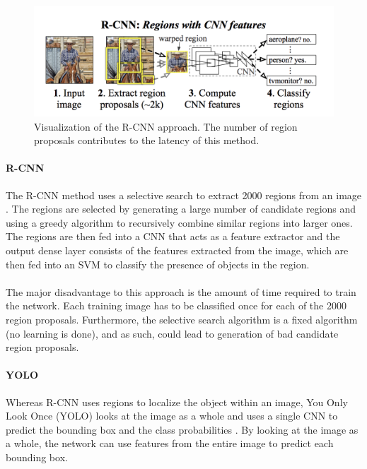 \begin{figure}[ht]
	\centering
	\includegraphics[width=.9\linewidth]{img/chapter2_background/rcnn.png}
	\caption{Visualization of the R-CNN approach. The number of region proposals contributes to the latency of this method.}
\end{figure}

\paragraph{R-CNN} The R-CNN method uses a selective search to extract 2000 regions from an image \cite{Girshick2014}. The regions are selected by generating a large number of candidate regions and using a greedy algorithm to recursively combine similar regions into larger ones. The regions are then fed into a CNN that acts as a feature extractor and the output dense layer consists of the features extracted from the image, which are then fed into an SVM to classify the presence of objects in the region.

\paragraph{}The major disadvantage to this approach is the amount of time required to train the network. Each training image has to be classified once for each of the 2000 region proposals. Furthermore, the selective search algorithm is a fixed algorithm (no learning is done), and as such, could lead to generation of bad candidate region proposals.

\paragraph{YOLO} \label{sec:backYOLO} Whereas R-CNN uses regions to localize the object within an image, You Only Look Once (YOLO) looks at the image as a whole and uses a single CNN to predict the bounding box and the class probabilities \cite{Redmon}. By looking at the image as a whole, the network can use features from the entire image to predict each bounding box.


